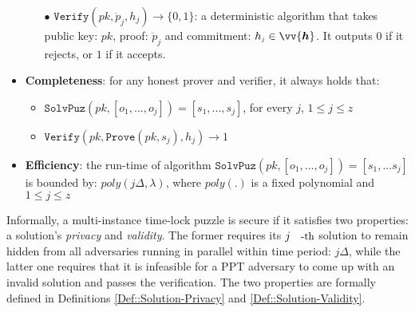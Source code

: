 \begin{definition}
\begin{itemize}[leftmargin=.43cm]
\begin{itemize}
\item[$\bullet$]$\mathtt {Verify}(pk,\ddot{p}_{\scriptscriptstyle j},h_{\scriptscriptstyle j})\rightarrow \{0,1\}$:  a deterministic algorithm that takes  public key: $pk$,  proof: $\ddot{p}_{\scriptscriptstyle j}$ and commitment: $h_{\scriptscriptstyle j}\in \vv{\bm{h}}$. It outputs  $0$ if it rejects, or $1$ if it accepts. 
\end{itemize}
\item \textbf{Completeness}: for any honest prover and verifier, it always holds that: 
\begin{itemize}
\item$\mathtt{SolvPuz}(pk,[o_{\scriptscriptstyle 1},...,o_{\scriptscriptstyle j}])=[s_{\scriptscriptstyle1},...,s_{\scriptscriptstyle j}]$, for every $j$, $1\leq j\leq z$

\item $\mathtt {Verify}(pk,\mathtt {Prove}(pk,s_{\scriptscriptstyle j}),h_{\scriptscriptstyle j})\rightarrow 1$
\end{itemize}
\item \textbf{Efficiency}: the run-time of algorithm $\mathtt {SolvPuz}(pk,[o_{\scriptscriptstyle 1},...,o_{\scriptscriptstyle j}])=[s_{\scriptscriptstyle1},...s_{\scriptscriptstyle j}]$ is bounded by:  $ poly(j\Delta,\lambda)$, where $poly(.)$ is a fixed polynomial and  $1\leq j\leq z$
\end{itemize}
\end{definition}
 
Informally, a multi-instance time-lock puzzle is secure if it satisfies two properties:  a solution's \emph{privacy} and  \emph{validity}. The former  requires  its $j\text{\small{-th}}$ solution   to remain hidden from all adversaries running in parallel within  time period: $j \Delta$, while the latter one requires that it is  infeasible for  a PPT adversary to come up with an invalid solution  and passes the verification. The two properties are formally defined in Definitions \ref{Def::Solution-Privacy} and \ref{Def::Solution-Validity}.
 

 
 
 
% 
 

